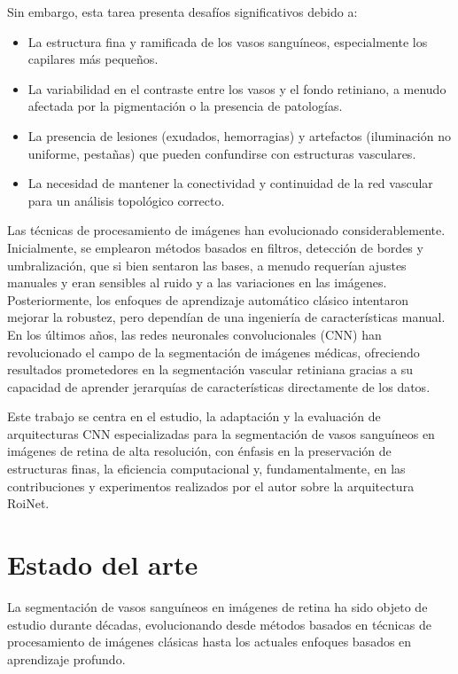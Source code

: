 \documentclass[11pt,a4paper]{report} %
\begin{document}
Sin embargo, esta tarea presenta desafíos significativos debido a:
\begin{itemize}
  \item La estructura fina y ramificada de los vasos sanguíneos, especialmente los capilares más pequeños.
  \item La variabilidad en el contraste entre los vasos y el fondo retiniano, a menudo afectada por la pigmentación o la presencia de patologías.
  \item La presencia de lesiones (exudados, hemorragias) y artefactos (iluminación no uniforme, pestañas) que pueden confundirse con estructuras vasculares.
  \item La necesidad de mantener la conectividad y continuidad de la red vascular para un análisis topológico correcto.
\end{itemize}

Las técnicas de procesamiento de imágenes han evolucionado considerablemente. Inicialmente, se emplearon métodos basados en filtros, detección de bordes y umbralización, que si bien sentaron las bases, a menudo requerían ajustes manuales y eran sensibles al ruido y a las variaciones en las imágenes. Posteriormente, los enfoques de aprendizaje automático clásico intentaron mejorar la robustez, pero dependían de una ingeniería de características manual. En los últimos años, las redes neuronales convolucionales (CNN) han revolucionado el campo de la segmentación de imágenes médicas, ofreciendo resultados prometedores en la segmentación vascular retiniana gracias a su capacidad de aprender jerarquías de características directamente de los datos.

Este trabajo se centra en el estudio, la adaptación y la evaluación de arquitecturas CNN especializadas para la segmentación de vasos sanguíneos en imágenes de retina de alta resolución, con énfasis en la preservación de estructuras finas, la eficiencia computacional y, fundamentalmente, en las contribuciones y experimentos realizados por el autor sobre la arquitectura RoiNet.

\chapter{Estado del arte}
La segmentación de vasos sanguíneos en imágenes de retina ha sido objeto de estudio durante décadas, evolucionando desde métodos basados en técnicas de procesamiento de imágenes clásicas hasta los actuales enfoques basados en aprendizaje profundo.
\end{document}
